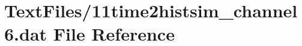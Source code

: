 \hypertarget{11time2histsim__channel6_8dat}{}\section{Text\+Files/11time2histsim\+\_\+channel6.dat File Reference}
\label{11time2histsim__channel6_8dat}
